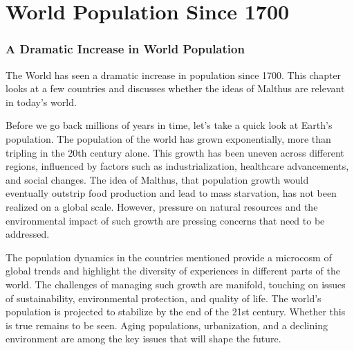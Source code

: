 \documentclass[a4paper,12pt]{book}
\newcommand{\inputtoc}[1]{}
\begin{document}
\chapter{World Population Since 1700}
\subsection*{A Dramatic Increase in World Population}
The World has seen a dramatic increase in population since 1700. This chapter looks at a few countries and discusses whether the ideas of Malthus are relevant in today's world.

\let\oldsection\section
\renewcommand{\section}[1]{\oldsection*{#1}\addcontentsline{toc}{section}{#1}}



Before we go back millions of years in time, let's take a quick look at Earth's population. The population of the world has grown exponentially, more than tripling in the 20th century alone. This growth has been uneven across different regions, influenced by factors such as industrialization, healthcare advancements, and social changes. The idea of Malthus, that population growth would eventually outstrip food production and lead to mass starvation, has not been realized on a global scale. However, pressure on natural resources and the environmental impact of such growth are pressing concerns that need to be addressed.

\inputtoc{england.tex}
\inputtoc{germany.tex}
\inputtoc{turkey.tex}
\inputtoc{SouthAfrica.tex}
\inputtoc{brazil.tex}
\inputtoc{russia.tex}
\inputtoc{australia.tex}
\inputtoc{korea.tex}
\inputtoc{japan.tex}
\inputtoc{indonesia.tex}
\inputtoc{india.tex}
\inputtoc{china.tex}
\inputtoc{mexico.tex}
\inputtoc{canada.tex}
\inputtoc{usa.tex}

\let\section\oldsection

The population dynamics in the countries mentioned provide a microcosm of global trends and highlight the diversity of experiences in different parts of the world. The challenges of managing such growth are manifold, touching on issues of sustainability, environmental protection, and quality of life.  The world's population is projected to stabilize by the end of the 21st century. Whether this is true remains to be seen. Aging populations, urbanization, and a declining environment are among the key issues that will shape the future. 
\end{document}

